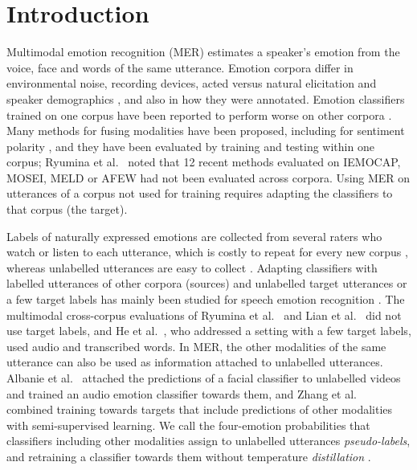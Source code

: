 \section{Introduction}\label{sec:intro}

Multimodal emotion recognition (MER) estimates a speaker's emotion from the voice, face and words of the same utterance. Emotion corpora differ in environmental noise, recording devices, acted versus natural elicitation and speaker demographics \cite{gideon2021addog}, and also in how they were annotated. Emotion classifiers trained on one corpus have been reported to perform worse on other corpora \cite{ryumina2025,gideon2021addog}. Many methods for fusing modalities have been proposed, including for sentiment polarity \cite{zadeh2017tfn,mittal2020m3er,yu2021selfmm,yun2024telme}, and they have been evaluated by training and testing within one corpus; Ryumina et al.\ \cite{ryumina2025} noted that 12 recent methods evaluated on IEMOCAP, MOSEI, MELD or AFEW had not been evaluated across corpora. Using MER on utterances of a corpus not used for training requires adapting the classifiers to that corpus (the target).

Labels of naturally expressed emotions are collected from several raters who watch or listen to each utterance, which is costly to repeat for every new corpus \cite{parthasarathy2020ladder,abdelwahab2018dann}, whereas unlabelled utterances are easy to collect \cite{abdelwahab2018dann}. Adapting classifiers with labelled utterances of other corpora (sources) and unlabelled target utterances or a few target labels has mainly been studied for speech emotion recognition \cite{abdelwahab2018dann,gideon2021addog,feng2023}. The multimodal cross-corpus evaluations of Ryumina et al.\ \cite{ryumina2025} and Lian et al.\ \cite{lian2026merbench} did not use target labels, and He et al.\ \cite{he2025m4ser}, who addressed a setting with a few target labels, used audio and transcribed words. In MER, the other modalities of the same utterance can also be used as information attached to unlabelled utterances. Albanie et al.\ \cite{albanie2018} attached the predictions of a facial classifier to unlabelled videos and trained an audio emotion classifier towards them, and Zhang et al.\ \cite{zhang2021combining} combined training towards targets that include predictions of other modalities with semi-supervised learning. We call the four-emotion probabilities that classifiers including other modalities assign to unlabelled utterances \emph{pseudo-labels}, and retraining a classifier towards them without temperature \emph{distillation} \cite{hinton2015distilling,albanie2018}.

